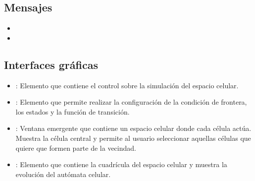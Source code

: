 \subsection{Mensajes}
\begin{itemize}
	\item {}
	\item {}
\end{itemize}

\subsection{Interfaces gráficas}
\begin{itemize}
	\item {}: Elemento que contiene el control sobre la simulación del espacio celular.
	\item {}: Elemento que permite realizar la configuración de la condición de frontera, los estados y la función de transición.
	\item {}: Ventana emergente que contiene un espacio celular donde cada célula actúa. Muestra la célula central y permite al usuario seleccionar aquellas células que quiere que formen parte de la vecindad.
	\item {}: Elemento que contiene la cuadrícula del espacio celular y muestra la evolución del autómata celular.
\end{itemize}